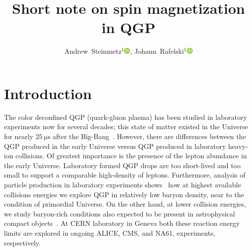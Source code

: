 \documentclass[epjST]{svjour}
\newcommand{\orcidicon}{\includegraphics[width=0.32cm]{orcid.pdf}}
\newcommand{\orc}[1]{\href{https://orcid.org/#1}{\orcidicon}}
\newcommand{\orcJR}{0000-0001-8217-1484}
\newcommand{\orcAJS}{0000-0001-5474-2649}
\begin{document}
\title{Short note on spin magnetization in QGP
    }

\author{
    Andrew~Steinmetz${}^1$\orc{\orcAJS},
    Johann~Rafelski${}^1$\orc{\orcJR}
    }



\maketitle

\section{Introduction}
\label{sec:introduction}
The color deconfined QGP (quark-gluon plasma) has been studied in laboratory experiments now for several decades; this state of matter  existed in the Universe for nearly \(25~\mathrm{\mu s}\) after the Big-Bang~\cite{Rafelski:2019twp,Rafelski:2023emw,Rafelski:2024fej}. However, there are differences between the QGP produced in the early Universe versus QGP produced in laboratory heavy-ion collisions. Of greatest importance is the presence of the lepton abundance in the early Universe. Laboratory formed QGP drops are too short-lived and too small to support a comparable high-density of leptons. Furthermore, analysis of particle production in laboratory experiments shows~\cite{Letessier:2005qe} how at highest available collisions energies we explore QGP in relatively low baryon density, near to the condition of primordial Universe. On the other hand, at lower collision energies, we study baryon-rich conditions also expected to be present in astrophysical compact objects~\cite{Ghosh:2025sjn}. At CERN laboratory in Geneva both these reaction energy limits are explored in ongoing ALICE, CMS, and NA61,  experiments, respectively. 
 
\end{document}

